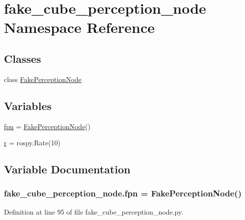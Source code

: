 \hypertarget{namespacefake__cube__perception__node}{}\section{fake\+\_\+cube\+\_\+perception\+\_\+node Namespace Reference}
\label{namespacefake__cube__perception__node}
\subsection*{Classes}
\begin{DoxyCompactItemize}
\item 
class \hyperlink{classfake__cube__perception__node_1_1FakePerceptionNode}{Fake\+Perception\+Node}
\end{DoxyCompactItemize}
\subsection*{Variables}
\begin{DoxyCompactItemize}
\item 
\hyperlink{namespacefake__cube__perception__node_a884c359a5cfb68aa706a9a0506d1ae2c}{fpn} = \hyperlink{classfake__cube__perception__node_1_1FakePerceptionNode}{Fake\+Perception\+Node}()
\item 
\hyperlink{namespacefake__cube__perception__node_a36e88703ab69fd35065e8a8d9344903e}{r} = rospy.\+Rate(10)
\end{DoxyCompactItemize}


\subsection{Variable Documentation}
\subsubsection[{\texorpdfstring{fpn}{fpn}}]{\setlength{\rightskip}{0pt plus 5cm}fake\+\_\+cube\+\_\+perception\+\_\+node.\+fpn = {\bf Fake\+Perception\+Node}()}\hypertarget{namespacefake__cube__perception__node_a884c359a5cfb68aa706a9a0506d1ae2c}{}\label{namespacefake__cube__perception__node_a884c359a5cfb68aa706a9a0506d1ae2c}


Definition at line 95 of file fake\+\_\+cube\+\_\+perception\+\_\+node.\+py.

